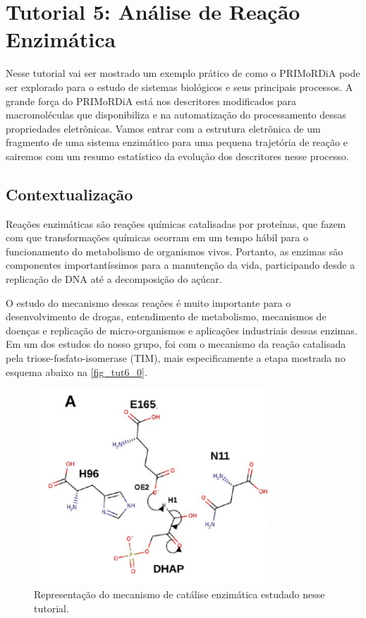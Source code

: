 \documentclass[a4paper,11pt]{refart}
\begin{document}
\newpage
\section{Tutorial 5: Análise de Reação Enzimática}

Nesse tutorial vai ser mostrado um exemplo prático de como o PRIMoRDiA pode ser explorado para o estudo de sistemas biológicos e seus principais processos. A grande força do PRIMoRDiA está nos descritores modificados para macromoléculas que disponibiliza e na automatização do processamento dessas propriedades eletrônicas. Vamos entrar com a estrutura eletrônica de um fragmento de uma sistema enzimático para uma pequena trajetória de reação e sairemos com um resumo estatístico da evolução dos descritores nesse processo.


\subsection{Contextualização}

Reações enzimáticas são reações químicas catalisadas por proteínas, que fazem com que transformações químicas ocorram em um tempo hábil para o funcionamento do metabolismo de organismos vivos. Portanto, as enzimas são componentes importantíssimos para a manutenção da vida, participando desde a replicação de DNA até a decomposição do açúcar.

O estudo do mecanismo dessas reações é muito importante para o desenvolvimento de drogas, entendimento de metabolismo, mecanismos de doenças e replicação de micro-organismos e aplicações industriais dessas enzimas. Em um dos estudos do nosso grupo, foi com o mecanismo da reação catalisada pela triose-fosfato-isomerase (TIM), mais especificamente a etapa mostrada no esquema abaixo na \autoref{fig_tut6_0}.

\hspace*{-\leftmarginwidth}
\begin{minipage}{\fullwidth}
	\begin{figure}[H]
		\begin{center}
			\includegraphics[width=3.5in]{images/tut6_img0}
			\caption{Representação do mecanismo de catálise enzimática estudado nesse tutorial.}
			\label{fig_tut6_0}
		\end{center}
	\end{figure}
\end{minipage}
\end{document}
